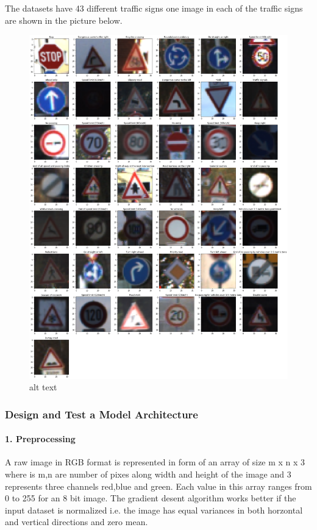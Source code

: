 \documentclass[11pt]{article}
\makeatletter
\def\maxwidth{\ifdim\Gin@nat@width>\linewidth\linewidth
    \else\Gin@nat@width\fi}
\let\Oldincludegraphics\includegraphics
\renewcommand{\includegraphics}[1]{\Oldincludegraphics[width=.8\maxwidth]{#1}}
\makeatother
\begin{document}
The datasets have 43 different traffic signs one image in each of the
traffic signs are shown in the picture below.

\begin{figure}
\centering
\includegraphics{./TrafficSigns.png}
\caption{alt text}
\end{figure}

\subsubsection{Design and Test a Model
Architecture}\label{design-and-test-a-model-architecture}

\paragraph{1. Preprocessing}\label{preprocessing}

A raw image in RGB format is represented in form of an array of size m x
n x 3 where is m,n are number of pixes along width and height of the
image and 3 represents three channels red,blue and green. Each value in
this array ranges from 0 to 255 for an 8 bit image. The gradient desent
algorithm works better if the input dataset is normalized i.e. the image
has equal variances in both horzontal and vertical directions and zero
mean.
\end{document}
